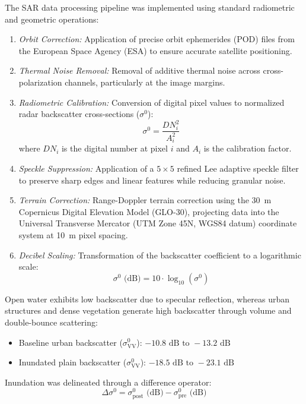\documentclass[OA,linenum]{InterPore}
\begin{document}
The SAR data processing pipeline was implemented using standard radiometric and geometric operations:
\begin{enumerate}
    \item \textit{Orbit Correction:} Application of precise orbit ephemerides (POD) files from the European Space Agency (ESA) to ensure accurate satellite positioning.
    \item \textit{Thermal Noise Removal:} Removal of additive thermal noise across cross-polarization channels, particularly at the image margins.
    \item \textit{Radiometric Calibration:} Conversion of digital pixel values to normalized radar backscatter cross-sections ($\sigma^0$):
    \begin{equation}
        \sigma^0 = \frac{DN_i^2}{A_i^2}
    \end{equation}
    where $DN_i$ is the digital number at pixel $i$ and $A_i$ is the calibration factor.
    \item \textit{Speckle Suppression:} Application of a $5 \times 5$ refined Lee adaptive speckle filter to preserve sharp edges and linear features while reducing granular noise.
    \item \textit{Terrain Correction:} Range-Doppler terrain correction using the 30~m Copernicus Digital Elevation Model (GLO-30), projecting data into the Universal Transverse Mercator (UTM Zone 45N, WGS84 datum) coordinate system at 10~m pixel spacing.
    \item \textit{Decibel Scaling:} Transformation of the backscatter coefficient to a logarithmic scale:
    \begin{equation}
        \sigma^0\text{ (dB)} = 10 \cdot \log_{10}(\sigma^0)
    \end{equation}
\end{enumerate}

Open water exhibits low backscatter due to specular reflection, whereas urban structures and dense vegetation generate high backscatter through volume and double-bounce scattering:
\begin{itemize}
    \item Baseline urban backscatter ($\sigma_{\text{VV}}^0$): $-10.8\text{ dB to } -13.2\text{ dB}$
    \item Inundated plain backscatter ($\sigma_{\text{VV}}^0$): $-18.5\text{ dB to } -23.1\text{ dB}$
\end{itemize}

Inundation was delineated through a difference operator:
\begin{equation}
    \Delta \sigma^0 = \sigma_{\text{post}}^0\text{ (dB)} - \sigma_{\text{pre}}^0\text{ (dB)}
\end{equation}
\end{document}
